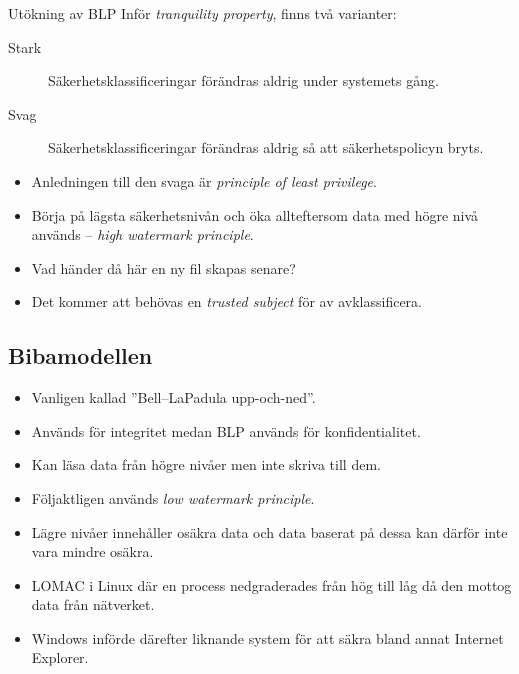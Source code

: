 \begin{frame}{\insertsubsectionhead}
  \begin{block}{Utökning av BLP}
    Inför \emph{tranquility property}, finns två varianter:
    \begin{description}
      \item[Stark] Säkerhetsklassificeringar förändras aldrig under systemets 
        gång.
      \item[Svag] Säkerhetsklassificeringar förändras aldrig så att 
        säkerhetspolicyn bryts.
    \end{description}
  \end{block}
  \begin{itemize}
    \item Anledningen till den svaga är \emph{principle of least privilege}.
    \item Börja på lägsta säkerhetsnivån och öka allteftersom data med högre 
      nivå används -- \emph{high watermark principle}.
    \item Vad händer då här en ny fil skapas senare?
    \item Det kommer att behövas en \emph{trusted subject} för av 
      avklassificera.
  \end{itemize}
\end{frame}

\subsection{Bibamodellen}
\begin{frame}{\insertsubsectionhead}
  \begin{itemize}
    \item Vanligen kallad ''Bell--LaPadula upp-och-ned''.
    \item Används för integritet medan BLP används för konfidentialitet.
    \item Kan läsa data från högre nivåer men inte skriva till dem.
    \item Följaktligen används \emph{low watermark principle}.
    \item Lägre nivåer innehåller osäkra data och data baserat på dessa kan 
      därför inte vara mindre osäkra.
    \item LOMAC i Linux där en process nedgraderades från hög till låg då den 
      mottog data från nätverket.
    \item Windows införde därefter liknande system för att säkra bland annat 
      Internet Explorer.
  \end{itemize}
\end{frame}

